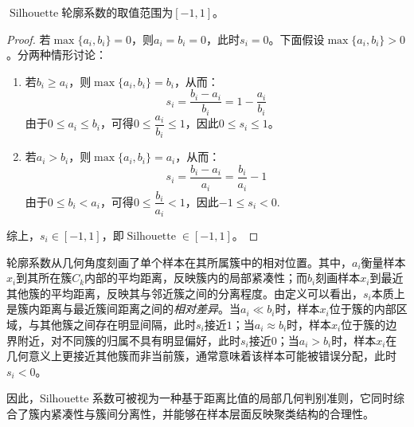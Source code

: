 \begin{property}[轮廓系数的取值范围]\label{prop:Silhouette}
	$\operatorname{Silhouette}$轮廓系数的取值范围为$[-1,1]$。
\end{property}
\begin{proof}
	若$\max\{a_i,b_i\}=0$，则$a_i=b_i=0$，此时$s_i=0$。下面假设$\max\{a_i,b_i\}>0$。分两种情形讨论：
	\begin{enumerate}
		\item 若$b_i\geqslant a_i$，则$\max\{a_i,b_i\}=b_i$，从而：
		\begin{equation*}
			s_i=\frac{b_i-a_i}{b_i}=1-\frac{a_i}{b_i}
		\end{equation*}
		由于$0\leqslant a_i\leqslant b_i$，可得$0\leqslant \dfrac{a_i}{b_i}\leqslant 1$，因此$0\leqslant s_i\leqslant 1$。		
		\item 若$a_i>b_i$，则$\max\{a_i,b_i\}=a_i$，从而：
		\begin{equation*}
			s_i=\frac{b_i-a_i}{a_i}=\frac{b_i}{a_i}-1
		\end{equation*}
		由于$0\leqslant b_i<a_i$，可得$0\leqslant\dfrac{b_i}{a_i}<1$，因此$-1\leqslant s_i<0.$
	\end{enumerate}
	综上，$s_i\in[-1,1]$，即$\operatorname{Silhouette}\in[-1,1]$。
\end{proof}
\begin{note}
	轮廓系数从几何角度刻画了单个样本在其所属簇中的相对位置。其中，$a_i$衡量样本$x_i$到其所在簇$C_k$内部的平均距离，反映簇内的局部紧凑性；而$b_i$刻画样本$x_i$到最近其他簇的平均距离，反映其与邻近簇之间的分离程度。由定义可以看出，$s_i$本质上是簇内距离与最近簇间距离之间的\emph{相对差异}。当$a_i\ll b_i$时，样本$x_i$位于簇的内部区域，与其他簇之间存在明显间隔，此时$s_i$接近$1$；当$a_i\approx b_i$时，样本$x_i$位于簇的边界附近，对不同簇的归属不具有明显偏好，此时$s_i$接近$0$；当$a_i>b_i$时，样本$x_i$在几何意义上更接近其他簇而非当前簇，通常意味着该样本可能被错误分配，此时$s_i<0$。\par	
	因此，Silhouette 系数可被视为一种基于距离比值的局部几何判别准则，它同时综合了簇内紧凑性与簇间分离性，并能够在样本层面反映聚类结构的合理性。
\end{note}
